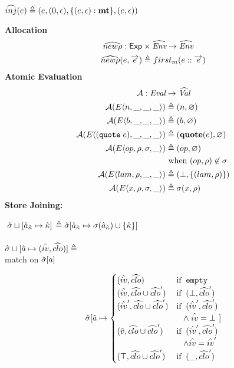 \documentclass[12pt,draft]{article}
\newcommand{\quotesyn}[1]{(\texttt{quote}\;#1)}
\newcommand{\store}[0]{\sigma}
\newcommand{\E}[4]{E\langle #1 , #2 , #3 , #4 \rangle}
\begin{document}
\begin{multicols*}{2}
\begin{center}
    $\widehat{inj}(e) \triangleq
    (e , (0 , \epsilon) , \{(e , \epsilon) : \textbf{mt}\} , (e , \epsilon))$
  \end{center}
  \textbf{Allocation} \\
  \vspace{-3mm}
  \begin{align*}
    \widehat{new\rho} : \textsf{Exp} &\times \widehat{\textit{Env}} \rightarrow \widehat{\textit{Env}} \\
    \widehat{new\rho}(e , \overrightarrow{e}) &\triangleq first_m(e::\overrightarrow{e})
  \end{align*}
  \textbf{Atomic Evaluation} \\
  \vspace{-3mm}
  \begin{align*}
    \mathcal{A} : \textit{Eval} &\rightarrow \aVal \\
    \mathcal{A}(\E{n}{\_}{\_}{\_}) &\triangleq (n , \varnothing) \\
    \mathcal{A}(\E{b}{\_}{\_}{\_}) &\triangleq (b , \varnothing) \\
    \mathcal{A}(\E{\quotesyn{e}}{\_}{\_}{\_}) &\triangleq
                                                (\textbf{quote}(e) , \varnothing) \\
    \mathcal{A}(\E{op}{\cenv}{\cstore}{\_})
                                &\triangleq (op , \varnothing) \\
                                &\text{ when } (op , \cenv) \not\in \cstore \\
    \mathcal{A}(\E{lam}{\cenv}{\_}{\_}) &\triangleq (\bot , \{(lam , \cenv)\}) \\
    \mathcal{A}(\E{x}{\cenv}{\cstore}{\_}) &\triangleq \cstore(x , \cenv)
  \end{align*}
  \textbf{Store Joining:}
  \begin{center}
    $\; \hat{\sigma} \sqcup [\hat{a}_{\hat{\kappa}} \mapsto \hat{\kappa}]$
    $\triangleq \astore[\akaddr \mapsto \store(\akaddr) \cup \{\akont\}]$ \\ \; \\
    $\hat{\sigma} \sqcup [\hat{a} \mapsto (\hat{iv} , \widehat{clo})] \triangleq$ \\
    match on $\hat{\sigma}[a]$
  \end{center}
  \[
    \hat{\sigma}[\hat{a} \mapsto \begin{cases}
      (\hat{iv} , \widehat{clo})
      &\text{if}\;\; \texttt{empty} \\
      (\hat{iv} , \widehat{clo} \cup \widehat{clo}')
      &\text{if}\;\; (\bot , \widehat{clo}') \\
      (\hat{iv}' , \widehat{clo} \cup \widehat{clo}')
      &\text{if}\;\; (\hat{iv}' , \widehat{clo}') \\&\;\;\; \land \; \hat{iv} = \bot \\
      (\hat{v} , \widehat{clo} \cup \widehat{clo}')
      &\text{if}\;\; (\hat{iv}' , \widehat{clo}') \\&\;\;\; \land \hat{iv} = \hat{iv}' \\
      (\top , \widehat{clo} \cup \widehat{clo}')
      &\text{if}\;\; (\_ , \widehat{clo}')
    \end{cases}]
  \]
\end{multicols*}
\end{document}
